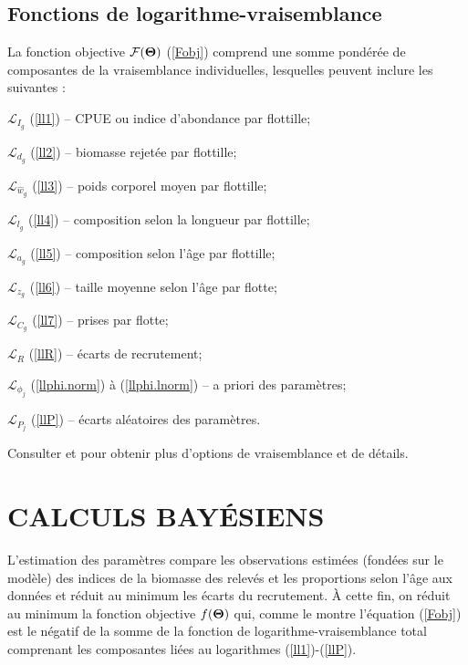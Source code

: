 \documentclass[11pt]{book}
\newcommand{\Lagr}{\mathcal{L}}%
\newcommand{\Fobj}{\mathcal{F}}%
\def\bfTh{{\bf \Theta}}%
\def\bfTh{{\bf \Theta}}          %
\newcommand{\eref}[1]{(\ref{#1})}
\begin{document}
\subsection{Fonctions de logarithme-vraisemblance}

La fonction objective $\Fobj(\bfTh)$ \eref{Fobj} comprend une somme pond\'{e}r\'{e}e de composantes de la vraisemblance individuelles, lesquelles peuvent inclure les suivantes :
\begin{itemize_csas}{}{}
  \item $\Lagr_{I_g}$ \eref{ll1} -- CPUE ou indice d'abondance par flottille;
  \item $\Lagr_{d_g}$ \eref{ll2} -- biomasse rejet\'{e}e par flottille;
  \item $\Lagr_{\widehat{w}_g}$ \eref{ll3} -- poids corporel moyen par flottille;
  \item $\Lagr_{l_g}$ \eref{ll4} -- composition selon la longueur par flottille;
  \item $\Lagr_{a_g}$ \eref{ll5} -- composition selon l'\^{a}ge par flottille;
  \item $\Lagr_{z_g}$ \eref{ll6} -- taille moyenne selon l'\^{a}ge par flotte;
  \item $\Lagr_{C_g}$ \eref{ll7} -- prises par flotte;
  \item $\Lagr_{R}$ \eref{llR}   --  \'{e}carts de recrutement;
  \item $\Lagr_{\phi_j}$ \eref{llphi.norm} \`{a} \eref{llphi.lnorm} -- a priori des param\`{e}tres;
  \item $\Lagr_{P_j}$ \eref{llP} -- \'{e}carts al\'{e}atoires des param\`{e}tres.
\end{itemize_csas}
Consulter \citet{Methot-Wetzel:2013} et \citet{Methot-etal:2020} pour obtenir plus d'options de vraisemblance et de d\'{e}tails.

\section{CALCULS BAY\'{E}SIENS}

L'estimation des param\`{e}tres compare les observations estim\'{e}es (fond\'{e}es sur le mod\`{e}le) des indices de la biomasse des relev\'{e}s et les proportions selon l'\^{a}ge aux donn\'{e}es et r\'{e}duit au minimum les \'{e}carts du recrutement.
\`{A} cette fin, on r\'{e}duit au minimum la fonction objective $f(\bfTh)$ qui, comme le montre l'\'{e}quation \eref{Fobj} est le n\'{e}gatif de la somme de la fonction de logarithme-vraisemblance total comprenant les composantes li\'{e}es au logarithmes \eref{ll1}-\eref{llP}.
\end{document}
